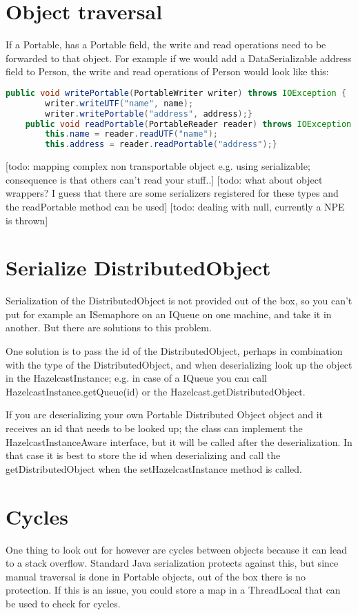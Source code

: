 \section{Object traversal}
If a Portable, has a Portable field, the write and read operations need to be forwarded to that object. For example if we would add a DataSerializable address field to Person, the write and read operations of Person would look like this:
\begin{lstlisting}[language=java]
    public void writePortable(PortableWriter writer) throws IOException {
        writer.writeUTF("name", name);
        writer.writePortable("address", address);}
    public void readPortable(PortableReader reader) throws IOException {
        this.name = reader.readUTF("name");
        this.address = reader.readPortable("address");}
\end{lstlisting}
[todo: mapping complex non transportable object e.g. using serializable; consequence is that others can't read your stuff..]
[todo: what about object wrappers? I guess that there are some serializers registered for these types and the readPortable method can be used]
[todo: dealing with null, currently a NPE is thrown]

\section{Serialize DistributedObject}
Serialization of the DistributedObject is not provided out of the box, so you can't put for example an ISemaphore on an IQueue on one machine, and take it in another. But there are solutions to this problem.

One solution is to pass the id of the DistributedObject, perhaps in combination with the type of the DistributedObject, and when deserializing look up the object in the HazelcastInstance; e.g. in case of a IQueue you can call HazelcastInstance.getQueue(id) or the Hazelcast.getDistributedObject.

If you are deserializing your own Portable Distributed Object object and it receives an id that needs to be looked up; the class can implement the HazelcastInstanceAware interface, but it will be called after the deserialization. In that case it is best to store the id when deserializing and call the getDistributedObject when the setHazelcastInstance method is called.

\section{Cycles}
One thing to look out for however are cycles between objects because it can lead to a stack overflow. Standard Java serialization protects against this, but since manual traversal is done in Portable objects, out of the box there is no protection. If this is an issue, you could store a map in a ThreadLocal that can be used to check for cycles.

